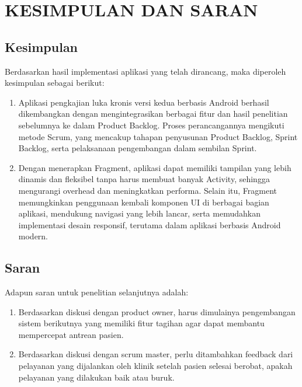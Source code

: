 
\chapter{KESIMPULAN DAN SARAN}

\section{Kesimpulan}
Berdasarkan hasil implementasi aplikasi yang telah dirancang, maka diperoleh kesimpulan sebagai berikut:

\begin{enumerate}
	\item Aplikasi pengkajian luka kronis versi kedua berbasis Android berhasil dikembangkan dengan mengintegrasikan berbagai fitur dan hasil penelitian sebelumnya ke dalam Product Backlog. Proses perancangannya mengikuti metode Scrum, yang mencakup tahapan penyusunan Product Backlog, Sprint Backlog, serta pelaksanaan pengembangan dalam sembilan Sprint.
	
	\item Dengan menerapkan Fragment, aplikasi dapat memiliki tampilan yang lebih dinamis dan fleksibel tanpa harus membuat banyak Activity, sehingga mengurangi overhead dan meningkatkan performa. Selain itu, Fragment memungkinkan penggunaan kembali komponen UI di berbagai bagian aplikasi, mendukung navigasi yang lebih lancar, serta memudahkan implementasi desain responsif, terutama dalam aplikasi berbasis Android modern.
\end{enumerate}

\section{Saran}
Adapun saran untuk penelitian selanjutnya adalah:
\begin{enumerate} 
	\item Berdasarkan diskusi dengan product owner, harus dimulainya pengembangan sistem berikutnya yang memiliki fitur tagihan agar dapat membantu mempercepat antrean pasien.
	\item Berdasarkan diskusi dengan scrum master, perlu ditambahkan feedback dari pelayanan yang dijalankan oleh klinik setelah pasien selesai berobat, apakah pelayanan yang dilakukan baik atau buruk.
\end{enumerate}


\begin{comment}

\end{comment}